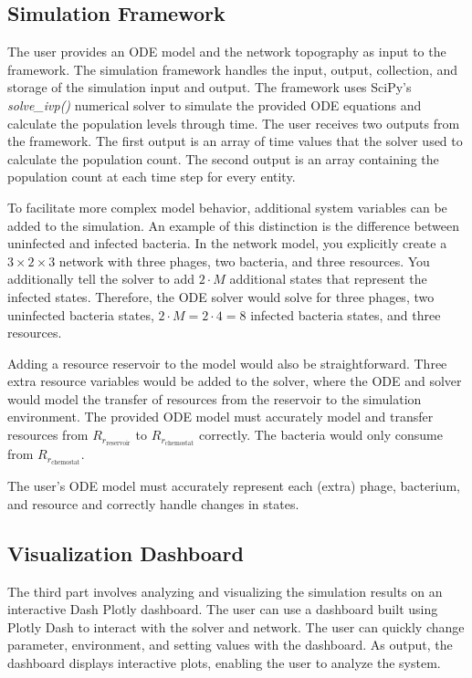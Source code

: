 \subsection{Simulation Framework} %
\label{sec:simulation_framework}
The user provides an ODE model and the network topography as input to the framework. 
The simulation framework handles the input, output, collection, and storage of the simulation input and output.
The framework uses SciPy's \cite{virtanenSciPy10Fundamental2020} \textit{solve\_ivp()} numerical solver \cite{ dormandFamilyEmbeddedRungeKutta1980} to simulate the provided ODE equations and calculate the population levels through time.
The user receives two outputs from the framework. 
The first output is an array of time values that the solver used to calculate the population count.
The second output is an array containing the population count at each time step for every entity.

To facilitate more complex model behavior, additional system variables can be added to the simulation.  
An example of this distinction is the difference between uninfected and infected bacteria. 
In the network model, you explicitly create a $3\times 2 \times 3$ network with three phages, two bacteria, and three resources. 
You additionally tell the solver to add $2\cdot M$ additional states that represent the infected states. 
Therefore, the ODE solver would solve for three phages, two uninfected bacteria states, $2\cdot M = 2\cdot 4 = 8$ infected bacteria states, and three resources. 

Adding a resource reservoir to the model would also be straightforward. 
Three extra resource variables would be added to the solver, where the ODE and solver would model the transfer of resources from the reservoir to the simulation environment. 
The provided ODE model must accurately model and transfer resources from $R_{r_{\text{reservoir}}}$ to $R_{r_{\text{chemostat}}}$ correctly. 
The bacteria would only consume from $R_{r_{\text{chemostat}}}$. 

The user's ODE model must accurately represent each (extra) phage, bacterium, and resource and correctly handle changes in states. 

\subsection{Visualization Dashboard}
\label{sec:visualization_framework}
The third part involves analyzing and visualizing the simulation results on an interactive Dash Plotly \cite{DashDocumentationUser} dashboard. 
The user can use a dashboard built using Plotly Dash to interact with the solver and network.
The user can quickly change parameter, environment, and setting values with the dashboard. 
As output, the dashboard displays interactive plots, enabling the user to analyze the system. 


